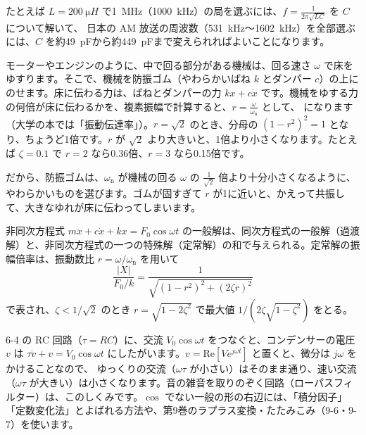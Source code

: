 たとえば $L=\qty{200}{\micro H}$ で\qty{1}{MHz}（\qty{1000}{kHz}）の局を選ぶには、$f=\frac{1}{2\pi\sqrt{LC}}$ を $C$ について解いて、
日本の AM 放送の周波数（\qty{531}{kHz}〜\qty{1602}{kHz}）を全部選ぶには、$C$ を約\qty{49}{pF}から約\qty{449}{pF}まで変えられればよいことになります。

\begin{motto}[5]
モーターやエンジンのように、中で回る部分がある機械は、回る速さ $\omega$ で床をゆすります。そこで、機械を防振ゴム（やわらかいばね $k$ とダンパー $c$）の上にのせます。床に伝わる力は、ばねとダンパーの力 $kx+c\dot x$ です。機械をゆする力の何倍が床に伝わるかを、複素振幅で計算すると、$r=\frac{\omega}{\omega_{\mathrm n}}$ として、
になります（大学の本では「振動伝達率」）。$r=\sqrt2$ のとき、分母の $(1-r^2)^2=1$ となり、ちょうど1倍です。$r$ が $\sqrt2$ より大きいと、1倍より小さくなります。たとえば $\zeta=0.1$ で $r=2$ なら0.36倍、$r=3$ なら0.15倍です。

だから、防振ゴムは、$\omega_{\mathrm n}$ が機械の回る $\omega$ の $\frac{1}{\sqrt2}$ 倍より十分小さくなるように、やわらかいものを選びます。ゴムが固すぎて $r$ が1に近いと、かえって共振して、大きなゆれが床に伝わってしまいます。
\end{motto}

\begin{senmonsho}[大学の教科書ふうの書き方]
\begin{bkhonbun}
非同次方程式 $m\ddot x+c\dot x+kx=F_0\cos\omega t$ の一般解は、同次方程式の一般解（過渡解）と、非同次方程式の一つの特殊解（定常解）の和で与えられる。定常解の振幅倍率は、振動数比 $r=\omega/\omega_{\mathrm n}$ を用いて
\[ \frac{\lvert X\rvert}{F_0/k}=\frac{1}{\sqrt{(1-r^2)^2+(2\zeta r)^2}} \]
で表され、$\zeta<1/\sqrt2$ のとき $r=\sqrt{1-2\zeta^2}$ で最大値 $1/(2\zeta\sqrt{1-\zeta^2})$ をとる。
\end{bkhonbun}
\end{senmonsho}

\begin{motto}[5]
6-4 の RC 回路（$\tau=RC$）に、交流 $V_0\cos\omega t$ をつなぐと、コンデンサーの電圧 $v$ は $\tau\dot v+v=V_0\cos\omega t$ にしたがいます。$v=\mathrm{Re}[Ve^{j\omega t}]$ と置くと、微分は $j\omega$ をかけることなので、
ゆっくりの交流（$\omega\tau$ が小さい）はそのまま通り、速い交流（$\omega\tau$ が大きい）は小さくなります。音の雑音を取りのぞく回路（ローパスフィルター）は、このしくみです。$\cos$ でない一般の形の右辺には、「積分因子」「定数変化法」とよばれる方法や、第9巻のラプラス変換・たたみこみ（9-6・9-7）を使います。
\end{motto}

